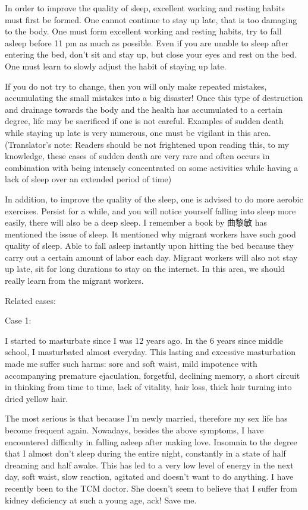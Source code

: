 \documentclass[
]{book}
\begin{document}
In order to improve the quality of sleep, excellent working and resting habits must first be formed. One cannot continue to stay up late, that is too damaging to the body. One must form excellent working and resting habits, try to fall asleep before 11 pm as much as possible. Even if you are unable to sleep after entering the bed, don't sit and stay up, but close your eyes and rest on the bed. One must learn to slowly adjust the habit of staying up late.

If you do not try to change, then you will only make repeated mistakes, accumulating the small mistakes into a big disaster! Once this type of destruction and drainage towards the body and the health has accumulated to a certain degree, life may be sacrificed if one is not careful. Examples of sudden death while staying up late is very numerous, one must be vigilant in this area. (Translator's note: Readers should be not frightened upon reading this, to my knowledge, these cases of sudden death are very rare and often occurs in combination with being intensely concentrated on some activities while having a lack of sleep over an extended period of time)

In addition, to improve the quality of the sleep, one is advised to do more aerobic exercises. Persist for a while, and you will notice yourself falling into sleep more easily, there will also be a deep sleep. I remember a book by 曲黎敏 has mentioned the issue of sleep. It mentioned why migrant workers have such good quality of sleep. Able to fall asleep instantly upon hitting the bed because they carry out a certain amount of labor each day. Migrant workers will also not stay up late, sit for long durations to stay on the internet. In this area, we should really learn from the migrant workers.

Related cases:

Case 1:

I started to masturbate since I was 12 years ago. In the 6 years since middle school, I masturbated almost everyday. This lasting and excessive masturbation made me suffer such harms: sore and soft waist, mild impotence with accompanying premature ejaculation, forgetful, declining memory, a short circuit in thinking from time to time, lack of vitality, hair loss, thick hair turning into dried yellow hair.

The most serious is that because I'm newly married, therefore my sex life has become frequent again. Nowadays, besides the above symptoms, I have encountered difficulty in falling asleep after making love. Insomnia to the degree that I almost don't sleep during the entire night, constantly in a state of half dreaming and half awake. This has led to a very low level of energy in the next day, soft waist, slow reaction, agitated and doesn't want to do anything. I have recently been to the TCM doctor. She doesn't seem to believe that I suffer from kidney deficiency at such a young age, ack! Save me.
\end{document}
